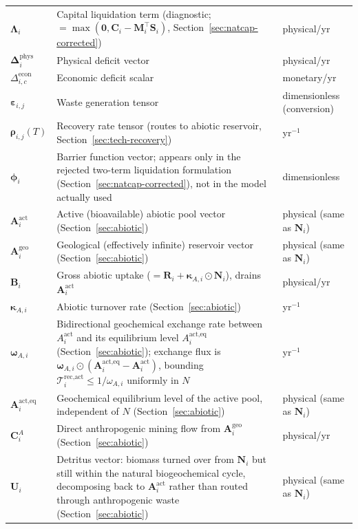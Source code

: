 \documentclass[twocolumn,10pt]{article}
\begin{document}
\begin{table}[t]
\begin{tabularx}{\textwidth}{l X l}
\(\boldsymbol{\Lambda}_i\) & Capital liquidation term (diagnostic; \(=\max(\mathbf 0,\mathbf C_i-\mathbf M_i^\top\mathbf S_i)\), Section~\ref{sec:natcap-corrected}) & physical/yr \\
\(\boldsymbol{\Delta}^{\text{phys}}_i\) & Physical deficit vector & physical/yr \\
\(\Delta^{\text{econ}}_{i,c}\) & Economic deficit scalar & monetary/yr \\
\(\boldsymbol{\varepsilon}_{i,j}\) & Waste generation tensor & dimensionless (conversion) \\
\(\boldsymbol{\rho}_{i,j}(T)\) & Recovery rate tensor (routes to abiotic reservoir, Section~\ref{sec:tech-recovery}) & yr\(^{-1}\) \\
\(\boldsymbol{\phi}_i\) & Barrier function vector; appears only in the rejected two-term liquidation formulation (Section~\ref{sec:natcap-corrected}), not in the model actually used & dimensionless \\
\(\mathbf{A}^{\text{act}}_i\) & Active (bioavailable) abiotic pool vector (Section~\ref{sec:abiotic}) & physical (same as \(\mathbf N_i\)) \\
\(\mathbf{A}^{\text{geo}}_i\) & Geological (effectively infinite) reservoir vector (Section~\ref{sec:abiotic}) & physical (same as \(\mathbf N_i\)) \\
\(\mathbf{B}_i\) & Gross abiotic uptake (\(=\mathbf R_i+\boldsymbol\kappa_{A,i}\odot\mathbf N_i\)), drains \(\mathbf A^{\text{act}}_i\) & physical/yr \\
\(\boldsymbol\kappa_{A,i}\) & Abiotic turnover rate (Section~\ref{sec:abiotic}) & yr\(^{-1}\) \\
\(\boldsymbol\omega_{A,i}\) & Bidirectional geochemical exchange rate between \(A^{\text{act}}_i\) and its equilibrium level \(A^{\text{act},\text{eq}}_i\) (Section~\ref{sec:abiotic}); exchange flux is \(\boldsymbol\omega_{A,i}\odot(\mathbf A^{\text{act},\text{eq}}_i-\mathbf A^{\text{act}}_i)\), bounding \(\mathcal T^{\text{rec},\text{act}}_i\le1/\omega_{A,i}\) uniformly in \(N\) & yr\(^{-1}\) \\
\(\mathbf{A}^{\text{act},\text{eq}}_i\) & Geochemical equilibrium level of the active pool, independent of \(N\) (Section~\ref{sec:abiotic}) & physical (same as \(\mathbf N_i\)) \\
\(\mathbf{C}^A_i\) & Direct anthropogenic mining flow from \(\mathbf A^{\text{geo}}_i\) (Section~\ref{sec:abiotic}) & physical/yr \\
\(\mathbf{U}_i\) & Detritus vector: biomass turned over from \(\mathbf N_i\) but still within the natural biogeochemical cycle, decomposing back to \(\mathbf A^{\text{act}}_i\) rather than routed through anthropogenic waste (Section~\ref{sec:abiotic}) & physical (same as \(\mathbf N_i\)) \\

\end{tabularx}
\end{table}
\end{document}
